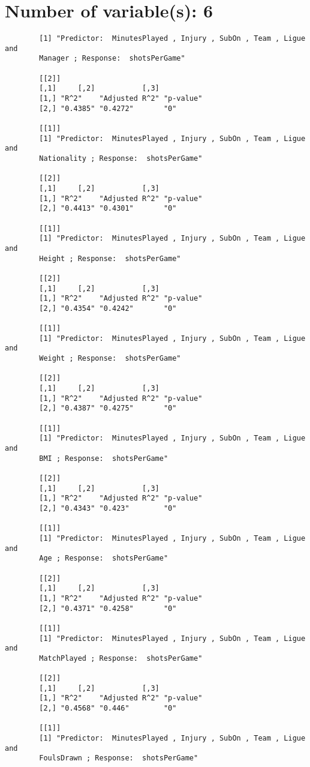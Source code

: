 \documentclass[12pt]{article}
\begin{document}
	\section{Number of variable(s): 6}
	\begin{verbatim}
		[1] "Predictor:  MinutesPlayed , Injury , SubOn , Team , Ligue and 
		Manager ; Response:  shotsPerGame"
		
		[[2]]
		[,1]     [,2]           [,3]     
		[1,] "R^2"    "Adjusted R^2" "p-value"
		[2,] "0.4385" "0.4272"       "0"      
		
		[[1]]
		[1] "Predictor:  MinutesPlayed , Injury , SubOn , Team , Ligue and 
		Nationality ; Response:  shotsPerGame"
		
		[[2]]
		[,1]     [,2]           [,3]     
		[1,] "R^2"    "Adjusted R^2" "p-value"
		[2,] "0.4413" "0.4301"       "0"      
		
		[[1]]
		[1] "Predictor:  MinutesPlayed , Injury , SubOn , Team , Ligue and 
		Height ; Response:  shotsPerGame"
		
		[[2]]
		[,1]     [,2]           [,3]     
		[1,] "R^2"    "Adjusted R^2" "p-value"
		[2,] "0.4354" "0.4242"       "0"      
		
		[[1]]
		[1] "Predictor:  MinutesPlayed , Injury , SubOn , Team , Ligue and 
		Weight ; Response:  shotsPerGame"
		
		[[2]]
		[,1]     [,2]           [,3]     
		[1,] "R^2"    "Adjusted R^2" "p-value"
		[2,] "0.4387" "0.4275"       "0"      
		
		[[1]]
		[1] "Predictor:  MinutesPlayed , Injury , SubOn , Team , Ligue and 
		BMI ; Response:  shotsPerGame"
		
		[[2]]
		[,1]     [,2]           [,3]     
		[1,] "R^2"    "Adjusted R^2" "p-value"
		[2,] "0.4343" "0.423"        "0"      
		
		[[1]]
		[1] "Predictor:  MinutesPlayed , Injury , SubOn , Team , Ligue and 
		Age ; Response:  shotsPerGame"
		
		[[2]]
		[,1]     [,2]           [,3]     
		[1,] "R^2"    "Adjusted R^2" "p-value"
		[2,] "0.4371" "0.4258"       "0"      
		
		[[1]]
		[1] "Predictor:  MinutesPlayed , Injury , SubOn , Team , Ligue and 
		MatchPlayed ; Response:  shotsPerGame"
		
		[[2]]
		[,1]     [,2]           [,3]     
		[1,] "R^2"    "Adjusted R^2" "p-value"
		[2,] "0.4568" "0.446"        "0"      
		
		[[1]]
		[1] "Predictor:  MinutesPlayed , Injury , SubOn , Team , Ligue and 
		FoulsDrawn ; Response:  shotsPerGame"
		

\end{verbatim}
\end{document}
